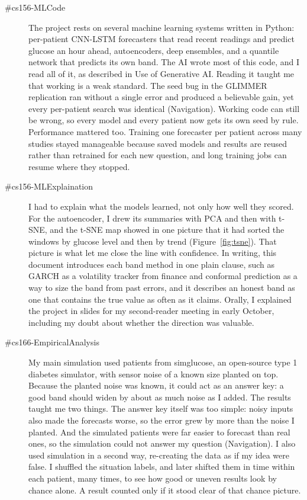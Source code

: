 \begin{description}
\item[\#cs156-MLCode] The project rests on several machine learning systems written in Python: per-patient CNN-LSTM forecasters that read recent readings and predict glucose an hour ahead, autoencoders, deep ensembles, and a quantile network that predicts its own band. The AI wrote most of this code, and I read all of it, as described in Use of Generative AI. Reading it taught me that working is a weak standard. The seed bug in the GLIMMER replication ran without a single error and produced a believable gain, yet every per-patient search was identical (Navigation). Working code can still be wrong, so every model and every patient now gets its own seed by rule. Performance mattered too. Training one forecaster per patient across many studies stayed manageable because saved models and results are reused rather than retrained for each new question, and long training jobs can resume where they stopped.

\item[\#cs156-MLExplaination] I had to explain what the models learned, not only how well they scored. For the autoencoder, I drew its summaries with PCA and then with t-SNE, and the t-SNE map showed in one picture that it had sorted the windows by glucose level and then by trend (Figure~\ref{fig:tsne}). That picture is what let me close the line with confidence. In writing, this document introduces each band method in one plain clause, such as GARCH as a volatility tracker from finance and conformal prediction as a way to size the band from past errors, and it describes an honest band as one that contains the true value as often as it claims. Orally, I explained the project in slides for my second-reader meeting in early October, including my doubt about whether the direction was valuable.

\item[\#cs166-EmpiricalAnalysis] My main simulation used patients from simglucose, an open-source type 1 diabetes simulator, with sensor noise of a known size planted on top. Because the planted noise was known, it could act as an answer key: a good band should widen by about as much noise as I added. The results taught me two things. The answer key itself was too simple: noisy inputs also made the forecasts worse, so the error grew by more than the noise I planted. And the simulated patients were far easier to forecast than real ones, so the simulation could not answer my question (Navigation). I also used simulation in a second way, re-creating the data as if my idea were false. I shuffled the situation labels, and later shifted them in time within each patient, many times, to see how good or uneven results look by chance alone. A result counted only if it stood clear of that chance picture.


\end{description}
